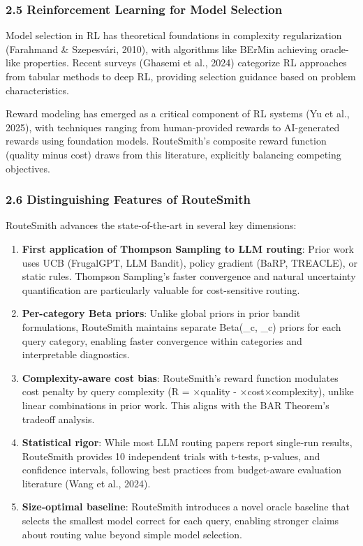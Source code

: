 \documentclass[
]{article}
\begin{document}
\hypertarget{reinforcement-learning-for-model-selection}{%
\subsubsection{2.5 Reinforcement Learning for Model
Selection}\label{reinforcement-learning-for-model-selection}}

Model selection in RL has theoretical foundations in complexity
regularization (Farahmand \& Szepesvári, 2010), with algorithms like
BErMin achieving oracle-like properties. Recent surveys (Ghasemi et al.,
2024) categorize RL approaches from tabular methods to deep RL,
providing selection guidance based on problem characteristics.

Reward modeling has emerged as a critical component of RL systems (Yu et
al., 2025), with techniques ranging from human-provided rewards to
AI-generated rewards using foundation models. RouteSmith's composite
reward function (quality minus cost) draws from this literature,
explicitly balancing competing objectives.

\hypertarget{distinguishing-features-of-routesmith}{%
\subsubsection{2.6 Distinguishing Features of
RouteSmith}\label{distinguishing-features-of-routesmith}}

RouteSmith advances the state-of-the-art in several key dimensions:

\begin{enumerate}
\def\labelenumi{\arabic{enumi}.}
\item
  \textbf{First application of Thompson Sampling to LLM routing}: Prior
  work uses UCB (FrugalGPT, LLM Bandit), policy gradient (BaRP,
  TREACLE), or static rules. Thompson Sampling's faster convergence and
  natural uncertainty quantification are particularly valuable for
  cost-sensitive routing.
\item
  \textbf{Per-category Beta priors}: Unlike global priors in prior
  bandit formulations, RouteSmith maintains separate Beta(\alpha\_c,
  \beta\_c) priors for each query category, enabling faster convergence
  within categories and interpretable diagnostics.
\item
  \textbf{Complexity-aware cost bias}: RouteSmith's reward function
  modulates cost penalty by query complexity (R = \alpha×quality -
  \beta×cost×complexity), unlike linear combinations in prior work. This
  aligns with the BAR Theorem's tradeoff analysis.
\item
  \textbf{Statistical rigor}: While most LLM routing papers report
  single-run results, RouteSmith provides 10 independent trials with
  t-tests, p-values, and confidence intervals, following best practices
  from budget-aware evaluation literature (Wang et al., 2024).
\item
  \textbf{Size-optimal baseline}: RouteSmith introduces a novel oracle
  baseline that selects the smallest model correct for each query,
  enabling stronger claims about routing value beyond simple model
  selection.
\end{enumerate}
\end{document}
